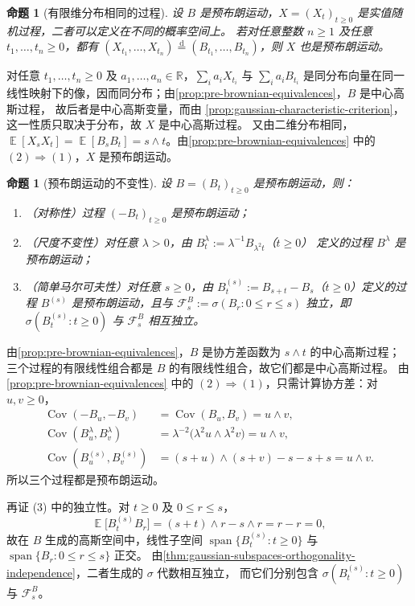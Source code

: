 \documentclass[UTF8,11pt,a4paper,oneside,fontset=fandol]{ctexrep}
\makeatletter
\numberwithin{equation}{section}
\theoremstyle{zhthm}
\newtheorem{proposition}[theorem]{命题}
\renewenvironment{proof}[1][\proofname]{\par
  \pushQED{\qed}%
  \normalfont\topsep6\p@\@plus6\p@\relax
  \trivlist
  \item[\hskip\labelsep\bfseries#1\hspace{0.5em}]\ignorespaces
}{%
  \popQED\endtrivlist\@endpefalse
}
\renewcommand{\proofname}{证明}
\newcommand{\R}{\mathbb{R}}
\newcommand{\F}{\mathcal{F}}
\DeclareMathOperator{\E}{\mathbb{E}}
\DeclareMathOperator{\Cov}{Cov}
\DeclareMathOperator{\Span}{span}
\newcommand{\deq}{\overset{\mathrm{d}}{=}}
\makeatother
\begin{document}
\begin{proposition}[有限维分布相同的过程]
\label{prop:pre-brownian-same-finite-dimensional-laws}
设 $B$ 是预布朗运动，$X=(X_t)_{t\ge0}$ 是实值随机过程，二者可以定义在不同的概率空间上。
若对任意整数 $n\ge1$ 及任意 $t_1,\ldots,t_n\ge0$，都有
$(X_{t_1},\ldots,X_{t_n})\deq(B_{t_1},\ldots,B_{t_n})$，则 $X$ 也是预布朗运动。
\end{proposition}

\begin{proof}
对任意 $t_1,\ldots,t_n\ge0$ 及 $a_1,\ldots,a_n\in\R$，$\sum_ia_iX_{t_i}$ 与 $\sum_ia_iB_{t_i}$
是同分布向量在同一线性映射下的像，因而同分布；由\cref{prop:pre-brownian-equivalences}，$B$ 是中心高斯过程，
故后者是中心高斯变量，而由%
\cref{prop:gaussian-characteristic-criterion}，这一性质只取决于分布，故 $X$ 是中心高斯过程。
又由二维分布相同，$\E[X_sX_t]=\E[B_sB_t]=s\wedge t$。由\cref{prop:pre-brownian-equivalences} 中的
$(2)\Rightarrow(1)$，$X$ 是预布朗运动。
\end{proof}

\begin{proposition}[预布朗运动的不变性]
\label{prop:pre-brownian-invariances}
设 $B=(B_t)_{t\ge0}$ 是预布朗运动，则：
\begin{enumerate}
  \item （对称性）过程 $(-B_t)_{t\ge0}$ 是预布朗运动；
  \item （尺度不变性）对任意 $\lambda>0$，由 $B_t^\lambda:=\lambda^{-1}B_{\lambda^2t}$（$t\ge0$）
    定义的过程 $B^\lambda$ 是预布朗运动；
  \item （简单马尔可夫性）对任意 $s\ge0$，由 $B_t^{(s)}:=B_{s+t}-B_s$（$t\ge0$）定义的过程 $B^{(s)}$
    是预布朗运动，且与 $\F_s^B:=\sigma(B_r:0\le r\le s)$ 独立，即
    $\sigma(B_t^{(s)}:t\ge0)$ 与 $\F_s^B$ 相互独立。
\end{enumerate}
\end{proposition}

\begin{proof}
由\cref{prop:pre-brownian-equivalences}，$B$ 是协方差函数为 $s\wedge t$ 的中心高斯过程；
三个过程的有限线性组合都是 $B$ 的有限线性组合，故它们都是中心高斯过程。
由\cref{prop:pre-brownian-equivalences} 中的 $(2)\Rightarrow(1)$，只需计算协方差：对 $u,v\ge0$，
\begin{align*}
  \Cov(-B_u,-B_v)&=\Cov(B_u,B_v)=u\wedge v,\\
  \Cov(B_u^\lambda,B_v^\lambda)&=\lambda^{-2}\bigl(\lambda^2u\wedge\lambda^2v\bigr)=u\wedge v,\\
  \Cov(B_u^{(s)},B_v^{(s)})&=(s+u)\wedge(s+v)-s-s+s=u\wedge v.
\end{align*}
所以三个过程都是预布朗运动。

再证 (3) 中的独立性。对 $t\ge0$ 及 $0\le r\le s$，
\[
  \E\bigl[B_t^{(s)}B_r\bigr]=(s+t)\wedge r-s\wedge r=r-r=0,
\]
故在 $B$ 生成的高斯空间中，线性子空间 $\Span\{B_t^{(s)}:t\ge0\}$ 与 $\Span\{B_r:0\le r\le s\}$ 正交。
由\cref{thm:gaussian-subspaces-orthogonality-independence}，二者生成的 $\sigma$ 代数相互独立，
而它们分别包含 $\sigma(B_t^{(s)}:t\ge0)$ 与 $\F_s^B$。
\end{proof}
\end{document}
